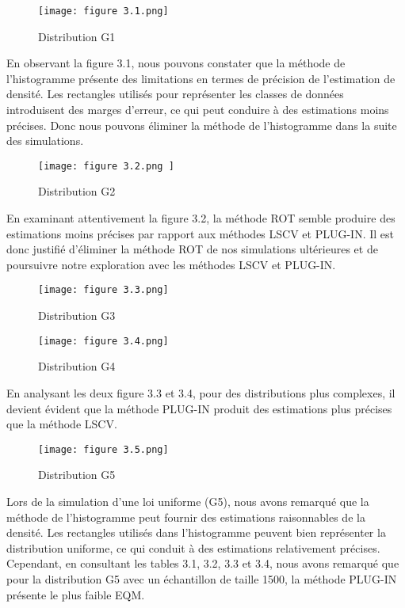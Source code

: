\begin{figure}[!h]
  \centering
  \texttt{[image: figure 3.1.png]}
  \caption{Distribution G1}
  \label{fig:Différentes méthodes appliquées à la distribution G1}
\end{figure}
En observant la figure 3.1, nous pouvons constater que la méthode de l'histogramme présente des limitations en termes de précision de l'estimation de densité. Les rectangles utilisés pour représenter les classes de données introduisent des marges d'erreur, ce qui peut conduire à des estimations moins précises. Donc nous pouvons éliminer la méthode de l'histogramme dans la suite des simulations.
\clearpage
\begin{figure}[!h]
  \centering
  \texttt{[image: figure 3.2.png ]}
  \caption{Distribution G2}
  \label{fig:Différentes méthodes appliquées à la distribution G2}
\end{figure}
En examinant attentivement la figure 3.2, la méthode ROT semble produire des estimations moins précises par rapport aux méthodes LSCV  et PLUG-IN. Il est donc justifié d'éliminer la méthode ROT de nos simulations ultérieures et de poursuivre notre exploration avec les méthodes LSCV et PLUG-IN. 
\clearpage
\begin{figure}[!h]
  \centering
  \texttt{[image: figure 3.3.png]}
  \caption{Distribution G3}
  \label{fig:Différentes méthodes appliquées à la distribution G3}
\end{figure}
\clearpage
\begin{figure}[!h]
  \centering
  \texttt{[image: figure 3.4.png]}
  \caption{Distribution G4}
  \label{fig:Différentes méthodes appliquées à la distribution G4}
\end{figure}
En analysant les deux figure 3.3 et 3.4, pour des distributions plus complexes, il devient évident que la méthode PLUG-IN produit des estimations plus précises que la méthode LSCV.
\clearpage
\begin{figure}[!h]
  \centering
  \texttt{[image: figure 3.5.png]}
  \caption{Distribution G5}
  \label{fig:Différentes méthodes appliquées à la distribution G5}
\end{figure}
Lors de la simulation d'une loi uniforme (G5), nous avons remarqué que la méthode de l'histogramme peut fournir des estimations raisonnables de la densité. Les rectangles utilisés dans l'histogramme peuvent bien représenter la distribution uniforme, ce qui conduit à des estimations relativement précises. Cependant, en consultant les tables 3.1, 3.2, 3.3 et 3.4, nous avons remarqué que pour la distribution G5 avec un échantillon de taille 1500, la méthode PLUG-IN présente le plus faible EQM.

